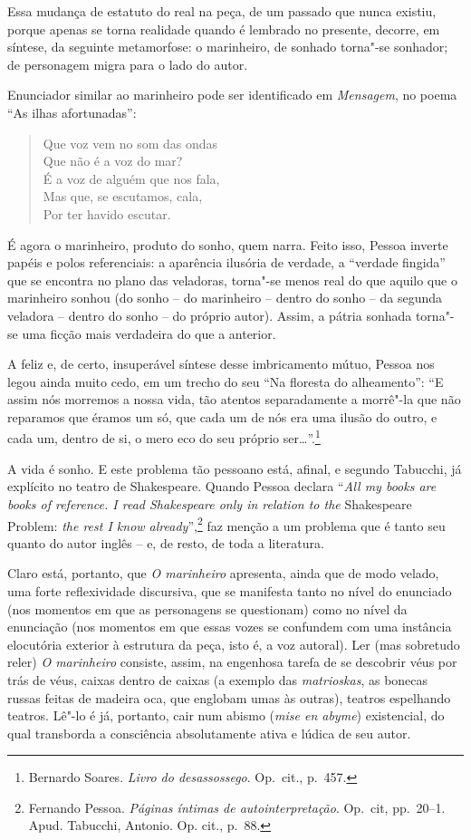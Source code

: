 Essa mudança de estatuto do real na peça, de um passado que nunca
existiu, porque apenas se torna realidade quando é lembrado no
presente, decorre, em síntese, da seguinte metamorfose: o marinheiro,
de sonhado torna"-se sonhador; de personagem migra para o lado do autor.


Enunciador similar ao marinheiro pode ser
identificado em
\textit{Mensagem}, no poema “As
ilhas afortunadas”: 
\begin{hedraquote}
\begin{verse}
Que voz vem no som das ondas\\
Que não é a voz do mar?\\ 
É a voz de alguém que nos fala,\\
Mas que, se escutamos, cala,\\
Por ter havido escutar.
\end{verse}
\end{hedraquote}

É agora o marinheiro, produto do sonho, quem narra. Feito isso, Pessoa
inverte papéis e polos referenciais: a aparência ilusória de verdade, a
“verdade fingida” que se encontra no plano das veladoras, torna"-se
menos real do que aquilo que o marinheiro sonhou (do sonho -- do
marinheiro -- dentro do sonho -- da segunda veladora -- dentro do sonho --
do próprio autor). Assim, a pátria sonhada torna"-se uma ficção mais
verdadeira do que a anterior. 

A feliz e, de certo, insuperável síntese desse imbricamento mútuo,
Pessoa nos legou ainda muito cedo, em um trecho do seu “Na floresta do 
alheamento”: “E assim nós morremos a
nossa vida, tão atentos separadamente a morrê"-la que não reparamos que
éramos um só, que cada um de nós era uma ilusão do outro, e cada um,
dentro de si, o mero eco do seu próprio ser\ldots{}”.\footnote{ 
Bernardo Soares. \textit{Livro do desassossego}. Op.~cit., p.~457.}

A vida é sonho. E este problema tão pessoano está, afinal, e segundo
Tabucchi, já explícito no teatro de Shakespeare. Quando Pessoa declara
``\textit{All my books are books of reference. I read Shakespeare only in
relation to the} Shakespeare Problem: \textit{the rest I know
already}'',\footnote{ Fernando Pessoa. \textit{Páginas íntimas de
autointerpretação}. Op.~cit, pp.~20--1. Apud. Tabucchi, Antonio. Op.
cit., p.~88.} faz menção a um problema que é tanto seu quanto do autor
inglês -- e, de resto, de toda a literatura. 

Claro está, portanto, que \textit{O marinheiro} apresenta, ainda que de
modo velado, uma forte reflexividade discursiva, que se manifesta tanto
no nível do enunciado (nos momentos em que as personagens se
questionam) como no nível da enunciação (nos momentos em que essas
vozes se confundem com uma instância elocutória exterior à estrutura da
peça, isto é, a voz autoral). Ler (mas sobretudo reler)
\textit{O marinheiro} consiste, assim, na engenhosa tarefa de se
descobrir véus por trás de véus, caixas dentro de caixas (a exemplo das
\textit{matrioskas}, as bonecas
russas feitas de madeira oca, que englobam umas às outras), teatros
espelhando teatros. Lê"-lo é já, portanto, cair num abismo (\textit{mise
en abyme}) existencial, do qual transborda a consciência absolutamente
ativa e lúdica de seu autor.  


